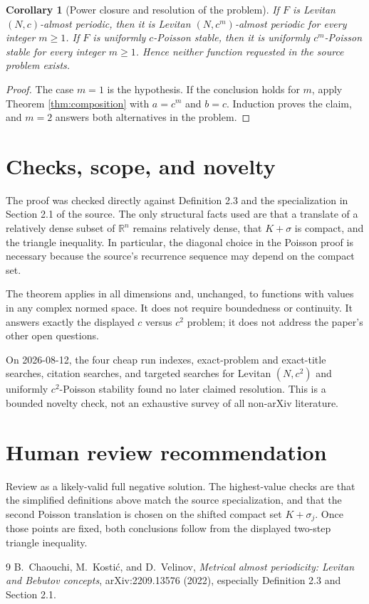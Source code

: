 \documentclass[11pt]{article}
\newtheorem{corollary}{Corollary}
\newcommand{\Rd}{\mathbb R^n}
\begin{document}
\begin{corollary}[Power closure and resolution of the problem]
If $F$ is Levitan $(N,c)$-almost periodic, then it is Levitan
$(N,c^m)$-almost periodic for every integer $m\ge1$.  If $F$ is uniformly
$c$-Poisson stable, then it is uniformly $c^m$-Poisson stable for every
integer $m\ge1$.  Hence neither function requested in the source problem
exists.
\end{corollary}

\begin{proof}
The case $m=1$ is the hypothesis.  If the conclusion holds for $m$, apply
Theorem \ref{thm:composition} with $a=c^m$ and $b=c$.  Induction proves the
claim, and $m=2$ answers both alternatives in the problem.
\end{proof}

\section*{Checks, scope, and novelty}

The proof was checked directly against Definition 2.3 and the specialization
in Section 2.1 of the source.  The only structural facts used are that a
translate of a relatively dense subset of $\Rd$ remains relatively dense,
that $K+\sigma$ is compact, and the triangle inequality.  In particular,
the diagonal choice in the Poisson proof is necessary because the source's
recurrence sequence may depend on the compact set.

The theorem applies in all dimensions and, unchanged, to functions with
values in any complex normed space.  It does not require boundedness or
continuity.  It answers exactly the displayed $c$ versus $c^2$ problem; it
does not address the paper's other open questions.

On 2026-08-12, the four cheap run indexes, exact-problem and exact-title
searches, citation searches, and targeted searches for Levitan
$(N,c^2)$ and uniformly $c^2$-Poisson stability found no later claimed
resolution.  This is a bounded novelty check, not an exhaustive survey of
all non-arXiv literature.

\section*{Human review recommendation}

Review as a likely-valid full negative solution.  The highest-value checks
are that the simplified definitions above match the source specialization,
and that the second Poisson translation is chosen on the shifted compact
set $K+\sigma_j$.  Once those points are fixed, both conclusions follow
from the displayed two-step triangle inequality.

\begin{thebibliography}{9}
B.~Chaouchi, M.~Kosti\'c, and D.~Velinov,
\emph{Metrical almost periodicity: Levitan and Bebutov concepts},
arXiv:2209.13576 (2022), especially Definition 2.3 and Section 2.1.
\end{thebibliography}
\end{document}

